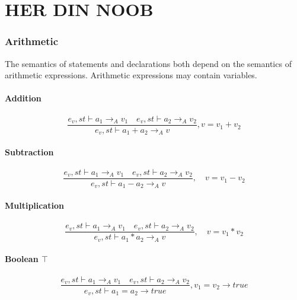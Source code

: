 \chapter{HER DIN NOOB}
\subsection*{Arithmetic}
The semantics of statements and declarations both depend on the semantics of arithmetic expressions.
Arithmetic expressions may contain variables.

\subsubsection{Addition}
\begin{equation}
	\frac { { e }_{ v },st\vdash { a }_{ 1 }{ \rightarrow  }_{ A }{ v }_{ 1 }\quad { e }_{ v },st\vdash { a }_{ 2 }{ \rightarrow  }_{ A }{ v }_{ 2 } }{ { e }_{ v },st\vdash { a }_{ 1 }+{ a }_{ 2 }{ \rightarrow  }_{ A }{ v } } , v = { v }_{ 1 }+{ v }_{ 2 }
\end{equation}


\subsubsection{Subtraction}
\begin{equation}
	\frac { { e }_{ v },st\vdash { a }_{ 1 }{ \rightarrow  }_{ A }{ v }_{ 1 }\quad { e }_{ v },st\vdash { a }_{ 2 }{ \rightarrow  }_{ A }{ v }_{ 2 } }{ { e }_{ v },st\vdash { a }_{ 1 }-{ a }_{ 2 }{ \rightarrow  }_{ A }{ v } } ,\quad v={ v }_{ 1 }-{ v }_{ 2 }
\end{equation}


\subsubsection{Multiplication}
\begin{equation}
	\frac { { e }_{ v },st\vdash { a }_{ 1 }{ \rightarrow  }_{ A }{ v }_{ 1 }\quad { e }_{ v },st\vdash { a }_{ 2 }{ \rightarrow  }_{ A }{ v }_{ 2 } }{ { e }_{ v },st\vdash { a }_{ 1 }\ast { a }_{ 2 }{ \rightarrow  }_{ A }{ v } } ,\quad v={ v }_{ 1 }\ast { v }_{ 2 }
\end{equation}


\subsubsection{Boolean $\top$}
\begin{equation}
	\frac { { e }_{ v },st\vdash { a }_{ 1 }{ \rightarrow  }_{ A }{ v }_{ 1 }\quad { e }_{ v },st\vdash { a }_{ 2 }{ \rightarrow  }_{ A }{ v }_{ 2 } }{ { e }_{ v },st\vdash { a }_{ 1 }={ a }_{ 2 }{ \rightarrow  }true } ,{ v }_{ 1 }={ v }_{ 2 }\rightarrow true
\end{equation}



